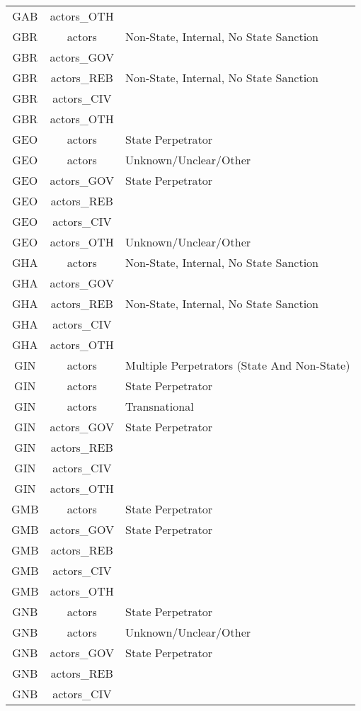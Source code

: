 \documentclass[12pt]{article}
\begin{document}
\begin{center}
\begin{longtable}{|c|c|p{10cm}|}
  GAB & actors\_OTH &  \\ 
  GBR & actors & Non-State, Internal, No State Sanction \\ 
  GBR & actors\_GOV &  \\ 
  GBR & actors\_REB & Non-State, Internal, No State Sanction \\ 
  GBR & actors\_CIV &  \\ 
  GBR & actors\_OTH &  \\ 
  GEO & actors & State Perpetrator \\ 
  GEO & actors & Unknown/Unclear/Other \\ 
  GEO & actors\_GOV & State Perpetrator \\ 
  GEO & actors\_REB &  \\ 
  GEO & actors\_CIV &  \\ 
  GEO & actors\_OTH & Unknown/Unclear/Other \\ 
  GHA & actors & Non-State, Internal, No State Sanction \\ 
  GHA & actors\_GOV &  \\ 
  GHA & actors\_REB & Non-State, Internal, No State Sanction \\ 
  GHA & actors\_CIV &  \\ 
  GHA & actors\_OTH &  \\ 
  GIN & actors & Multiple Perpetrators (State And Non-State) \\ 
  GIN & actors & State Perpetrator \\ 
  GIN & actors & Transnational \\ 
  GIN & actors\_GOV & State Perpetrator \\ 
  GIN & actors\_REB &  \\ 
  GIN & actors\_CIV &  \\ 
  GIN & actors\_OTH &  \\ 
  GMB & actors & State Perpetrator \\ 
  GMB & actors\_GOV & State Perpetrator \\ 
  GMB & actors\_REB &  \\ 
  GMB & actors\_CIV &  \\ 
  GMB & actors\_OTH &  \\ 
  GNB & actors & State Perpetrator \\ 
  GNB & actors & Unknown/Unclear/Other \\ 
  GNB & actors\_GOV & State Perpetrator \\ 
  GNB & actors\_REB &  \\ 
  GNB & actors\_CIV &  \\ 

\end{longtable}
\end{center}
\end{document}
